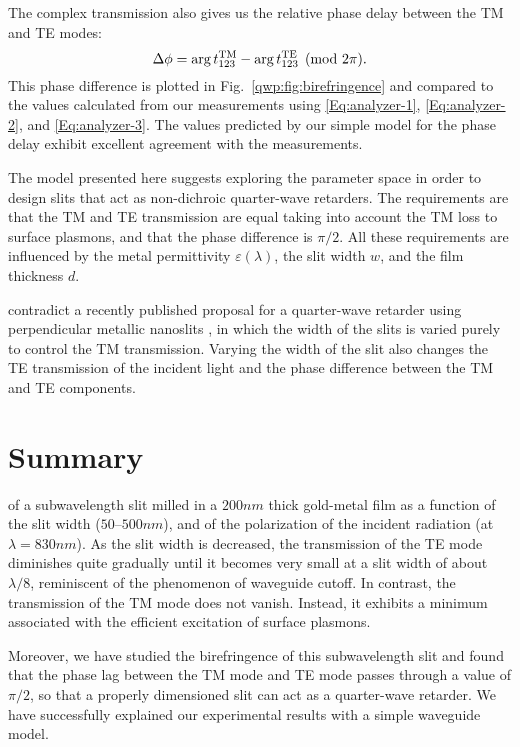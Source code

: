 The complex transmission also gives us the relative phase delay between the \gls{TM} and \gls{TE} modes:
\begin{equation}
\Delta\phi = \arg t_{123}^{\text{TM}} - \arg t_{123}^{\text{TE}} \pmod{2\pi}. \label{eq:deltaphi}
\end{equation}
This phase difference is plotted in Fig.~\ref{qwp:fig:birefringence} and compared to the values calculated from our measurements using \eqref{Eq:analyzer-1}, \eqref{Eq:analyzer-2}, and \eqref{Eq:analyzer-3}.
The values predicted by our simple model for the phase delay exhibit excellent agreement with the measurements.

The model presented here suggests exploring the parameter space in order to design slits that act as non-dichroic quarter-wave retarders.
The requirements are that the \gls{TM} and \gls{TE} transmission are equal taking into account the \gls{TM} loss to surface plasmons, and that the phase difference is $\pi/2$.
All these requirements are influenced by the metal permittivity $\varepsilon(\lambda)$, the slit width $w$, and the film thickness $d$.

 contradict a recently published proposal for a quarter-wave retarder using perpendicular metallic nanoslits \cite{Khoo2011}, in which the width of the slits is varied purely to control the \gls{TM} transmission.
Varying the width of the slit also changes the \gls{TE} transmission of the incident light and the phase difference between the \gls{TM} and \gls{TE} components.

\section{Summary}

 of a subwavelength slit milled in a $200\unit{nm}$ thick gold-metal film as a function of the slit width ($50$--$500\unit{nm}$), and of the polarization of the incident radiation (at $\lambda = 830\unit{nm}$).
As the slit width is decreased, the transmission of the \gls{TE} mode diminishes quite gradually until it becomes very small at a slit width of about $\lambda/8$, reminiscent of the phenomenon of waveguide cutoff.
In contrast, the transmission of the \gls{TM} mode does not vanish.
Instead, it exhibits a minimum associated with the efficient excitation of surface plasmons.

Moreover, we have studied the birefringence of this subwavelength slit and found that the phase lag between the \gls{TM} mode and \gls{TE} mode passes through a value of $\pi/2$, so that a properly dimensioned slit can act as a quarter-wave retarder.
We have successfully explained our experimental results with a simple waveguide model.
